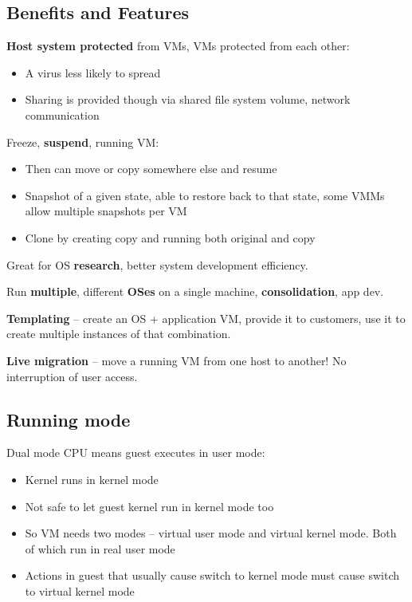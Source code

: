 \subsection{Benefits and Features}

\textbf{Host system protected} from VMs, VMs protected from each other:
\begin{itemize}
    \item A virus less likely to spread
    \item Sharing is provided though via shared file system volume, network communication
\end{itemize}


Freeze, \textbf{suspend}, running VM:

\begin{itemize}
    \item Then can move or copy somewhere else and resume
    \item Snapshot of a given state, able to restore back to that state, some VMMs allow multiple snapshots per VM
    \item Clone by creating copy and running both original and copy
\end{itemize}

\noindent Great for OS \textbf{research}, better system development efficiency.

\vspace{1em}

\noindent Run \textbf{multiple}, different \textbf{OSes} on a single machine, \textbf{consolidation}, app dev.

\vspace{1em}
\noindent \textbf{Templating} – create an OS + application VM, provide it to customers, use it to create multiple instances of that combination.

\vspace{1em}
\noindent \textbf{Live migration} – move a running VM from one host to another! No interruption of user access.

\subsection{Running mode}
Dual mode CPU means guest executes in user mode:

\begin{itemize}
    \item[] Kernel runs in kernel mode
    \item[] Not safe to let guest kernel run in kernel mode too
    \item[] So VM needs two modes – virtual user mode and virtual kernel mode. Both of which run in real user mode
    \item[] Actions in guest that usually cause switch to kernel mode must cause switch to virtual kernel mode
\end{itemize}

